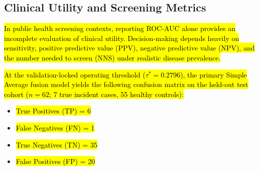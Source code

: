 \documentclass[10pt,letterpaper]{article}
\begin{document}
\subsection*{Clinical Utility and Screening Metrics}

\hl{In public health screening contexts, reporting ROC-AUC alone provides an incomplete evaluation of clinical utility. Decision-making depends heavily on sensitivity, positive predictive value (PPV), negative predictive value (NPV), and the number needed to screen (NNS) under realistic disease prevalence.}

\hl{At the validation-locked operating threshold ($\tau^* = 0.2796$), the primary Simple Average fusion model yields the following confusion matrix on the held-out test cohort ($n=62$; 7 true incident cases, 55 healthy controls):}
\begin{itemize}
    \item \hl{True Positives (TP) = 6}
    \item \hl{False Negatives (FN) = 1}
    \item \hl{True Negatives (TN) = 35}
    \item \hl{False Positives (FP) = 20}
\end{itemize}
\end{document}
